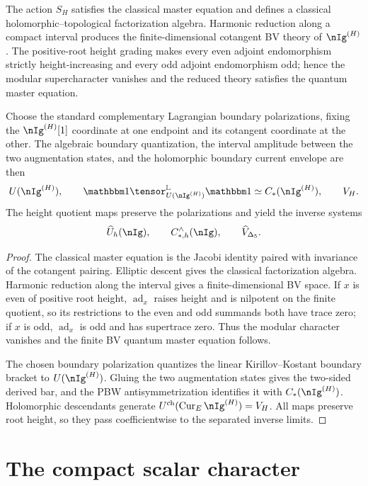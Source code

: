 \begin{theorem}
The action $S_H$ satisfies the classical master equation and defines a classical holomorphic--topological factorization algebra.  Harmonic reduction along a compact interval produces the finite-dimensional cotangent BV theory of $\nIg^{(H)}$.  The positive-root height grading makes every even adjoint endomorphism strictly height-increasing and every odd adjoint endomorphism odd; hence the modular supercharacter vanishes and the reduced theory satisfies the quantum master equation.

Choose the standard complementary Lagrangian boundary polarizations, fixing the $\nIg^{(H)}[1]$ coordinate at one endpoint and its cotangent coordinate at the other.  The algebraic boundary quantization, the interval amplitude between the two augmentation states, and the holomorphic boundary current envelope are then
\[
 U(\nIg^{(H)}),\qquad
 \mathbbm1\tensor^{\mathbb L}_{U(\nIg^{(H)})}\mathbbm1
 \simeq C_*(\nIg^{(H)}),\qquad V_H.
\]
The height quotient maps preserve the polarizations and yield the inverse systems
\[
 \widehat U_h(\nIg),\qquad
 C_{*,h}^{\wedge}(\nIg),\qquad
 \widehat V_{\Delta_5}.
\]
\end{theorem}
\begin{proof}
The classical master equation is the Jacobi identity paired with invariance of the cotangent pairing.  Elliptic descent gives the classical factorization algebra.  Harmonic reduction along the interval gives a finite-dimensional BV space.  If $x$ is even of positive root height, $\operatorname{ad}_x$ raises height and is nilpotent on the finite quotient, so its restrictions to the even and odd summands both have trace zero; if $x$ is odd, $\operatorname{ad}_x$ is odd and has supertrace zero.  Thus the modular character vanishes and the finite BV quantum master equation follows.

The chosen boundary polarization quantizes the linear Kirillov--Kostant boundary bracket to $U(\nIg^{(H)})$.  Gluing the two augmentation states gives the two-sided derived bar, and the PBW antisymmetrization identifies it with $C_*(\nIg^{(H)})$.  Holomorphic descendants generate $U^{\mathrm{ch}}(\operatorname{Cur}_E\nIg^{(H)})=V_H$.  All maps preserve root height, so they pass coefficientwise to the separated inverse limits.
\end{proof}

\part{The compact scalar character}

